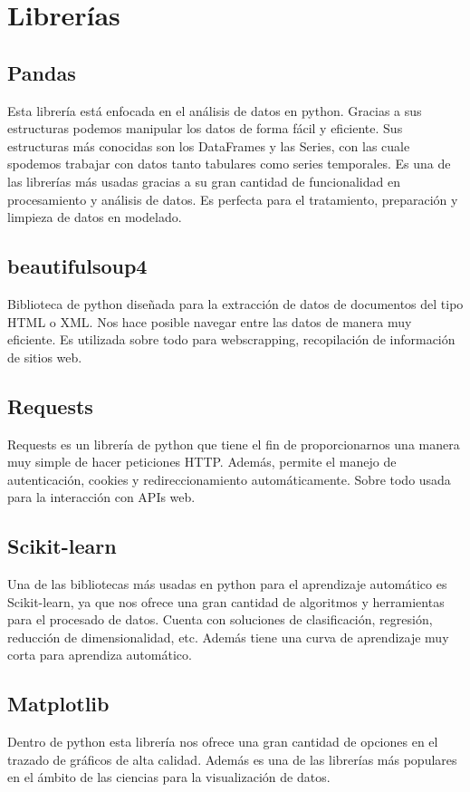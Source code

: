 \section{Librerías}

\subsection{Pandas}
Esta librería está enfocada en el análisis de datos en python. Gracias a sus estructuras podemos manipular los datos de forma fácil y eficiente. Sus estructuras más conocidas son los DataFrames y las Series, con las cuale spodemos trabajar con datos tanto tabulares como series temporales. Es una de las librerías más usadas gracias a su gran cantidad de funcionalidad en procesamiento y análisis de datos. Es perfecta para el tratamiento, preparación y limpieza de datos en modelado.

\subsection{beautifulsoup4}
Biblioteca de python diseñada para la extracción de datos de documentos del tipo HTML o XML. Nos hace posible navegar entre las datos de manera muy eficiente. Es utilizada sobre todo para webscrapping, recopilación de información de sitios web. 


\subsection{Requests}
Requests es un librería de python que tiene el fin de proporcionarnos una manera muy simple de hacer peticiones HTTP. Además, permite el manejo de autenticación, cookies y redireccionamiento automáticamente. Sobre todo usada para la interacción con APIs web.

\subsection{Scikit-learn}
Una de las bibliotecas más usadas en python para el aprendizaje automático es Scikit-learn, ya que nos ofrece una gran cantidad de algoritmos y herramientas para el procesado de datos. Cuenta con soluciones de clasificación, regresión, reducción de dimensionalidad, etc. Además tiene una curva de aprendizaje muy corta para aprendiza automático.

\subsection{Matplotlib}
Dentro de python esta librería nos ofrece una gran cantidad de opciones en el trazado de gráficos de alta calidad. Además es una de las librerías más populares en el ámbito de las ciencias para la visualización de datos.
